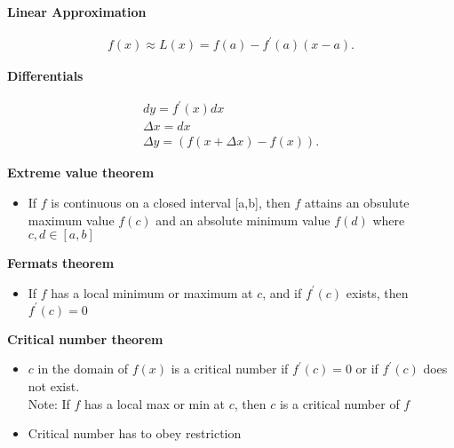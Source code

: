 \documentclass{report}
\begin{document}
    \bigbreak \noindent \bigbreak \noindent 
    \begin{large}
        \textbf{Linear Approximation}
    \end{large}
    \begin{align*}
        f(x) \approx L(x) = f(a) - f^{\prime}(a)(x-a)
    .\end{align*}

    \pagebreak \bigbreak \noindent
    \begin{large}
        \textbf{Differentials}
    \end{large}
    \begin{align*}
      dy = f^{\prime}(x)dx \\
      \Delta x = dx \\
      \Delta y = (f(x+\Delta x) -f(x))
    .\end{align*}
    \bigbreak \noindent 


    \bigbreak \noindent \bigbreak \noindent 
    \begin{large}
        \textbf{Extreme value theorem}
    \end{large}
        \begin{itemize}
      \item If $f$ is continuous on a closed interval [a,b], then $f$ attains an
      obsulute maximum value $f(c)$ and an absolute minimum value $f(d)$ where $c,d \in [a,b]$
    \end{itemize}

    \bigbreak \noindent \bigbreak \noindent 
    \begin{large}
        \textbf{Fermats theorem}
    \end{large}
    \begin{itemize}
      \item If $f$ has a local minimum or maximum at $c$, and if $f^{\prime}(c)$ exists, 
      then $f^{\prime}(c)=0$
    \end{itemize}

    \bigbreak \noindent \bigbreak \noindent 
    \begin{large}
        \textbf{Critical number theorem}
    \end{large}
        \begin{itemize}
      \item $c$ in the domain of $f(x)$ is a critical number if $f^{\prime}(c)=0$ or if $f^{\prime}(c)$ does not exist. \\
      Note: If $f$ has a local max or min at $c$, then $c$ is a critical number of $f$ 
      \item Critical number has to obey restriction
    \end{itemize}
\end{document}
